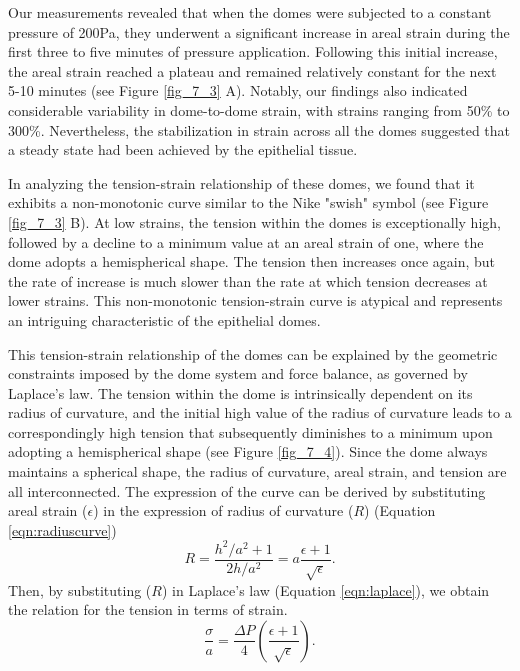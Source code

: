 Our measurements revealed that when the domes were subjected to a
constant pressure of 200Pa, they underwent a significant increase in
areal strain during the first three to five minutes of pressure
application. Following this initial increase, the areal strain reached a
plateau and remained relatively constant for the next 5-10 minutes (see Figure \ref{fig_7_3} A).
Notably, our findings also
indicated considerable variability in dome-to-dome strain, with strains
ranging from 50\% to 300\%. Nevertheless, the stabilization in strain
across all the domes suggested that a steady state had been achieved by
the epithelial tissue.

In analyzing the tension-strain relationship of these domes, we found
that it exhibits a non-monotonic curve similar to the Nike "swish"
symbol (see Figure \ref{fig_7_3} B).  At low strains,
the tension within the domes is exceptionally high, followed by a
decline to a minimum value at an areal strain of one, where the dome
adopts a hemispherical shape. The tension then increases once again, but
the rate of increase is much slower than the rate at which tension
decreases at lower strains. This non-monotonic tension-strain curve is
atypical and represents an intriguing characteristic of the epithelial
domes.

This tension-strain relationship of the domes can be explained by the
geometric constraints imposed by the dome system and force balance, as
governed by Laplace's law. The tension within the dome is intrinsically
dependent on its radius of curvature, and the initial high value of the
radius of curvature leads to a correspondingly high tension that
subsequently diminishes to a minimum upon adopting a hemispherical shape (see Figure \ref{fig_7_4}).
Since the dome always maintains a spherical shape, the radius of curvature, areal strain, and
tension are all interconnected. The expression of the curve can be
derived by substituting areal strain (\(\epsilon\)) in the expression of
radius of curvature (\(R\)) (Equation \ref{eqn:radiuscurve})
\begin{equation}
	R = \frac{h^2/a^2 + 1}{2h/a^2} = a\frac{\epsilon + 1}{\sqrt{\epsilon}}.
\end{equation}
Then, by substituting ($R$) in Laplace's law (Equation \ref{eqn:laplace}), we obtain the relation for the tension in terms of strain.
\begin{equation}
	\label{eqn:isobaric}
	\frac{\sigma}{a} = \frac{\Delta P}{4} \left( \frac{\epsilon + 1}{\sqrt{\epsilon}} \right).
\end{equation}

